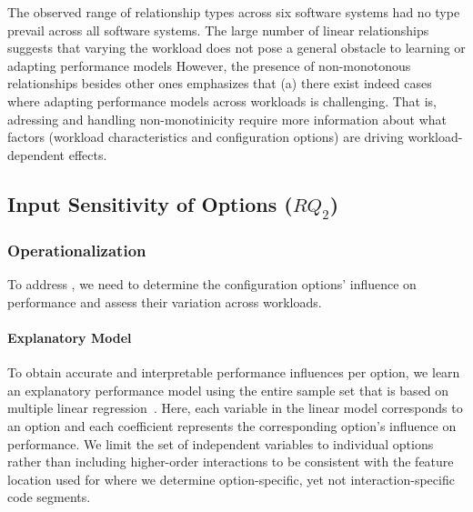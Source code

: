 {The observed range of relationship types across six software systems had no type prevail across all software systems. The large number of linear relationships suggests that varying the workload does not pose a general obstacle to learning or adapting performance models However, the presence of non-monotonous relationships besides other ones emphasizes that (a) there exist indeed cases where adapting performance models across workloads is challenging. That is, adressing and handling non-monotinicity require more information about what factors (workload characteristics and configuration options) are driving workload-dependent effects.
\vspace{1mm}

\subsection{Input Sensitivity of Options ($RQ_2$)}\label{sec:rq2}

\subsubsection{Operationalization}
To address , we need to determine the configuration options’ influence on performance and assess their variation across workloads. 

\paragraph*{Explanatory Model}
To obtain accurate and interpretable performance influences per option, we learn an explanatory performance model using the entire sample set that is based on multiple linear regression~\cite{dorn2020,siegmundPerformanceinfluenceModelsHighly2015,perLasso}. Here, each variable in the linear model corresponds to an option and each coefficient represents the corresponding option's influence on performance. 
We limit the set of independent variables to individual options rather than including higher-order interactions to be consistent with the feature location used for  where we determine option-specific, yet not interaction-specific code segments.
}
